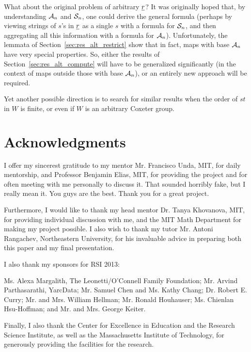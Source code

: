 What about the original problem of arbitrary $\ul r$?  It was originally hoped that, by understanding $\AA_n$ and $\SS_n$, one could derive the general formula (perhaps by viewing strings of $s$'s in $\ul r$ as a single $s$ with a formula for $\SS_n$, and then aggregating all this information with a formula for $\AA_n$).  Unfortunately, the lemmata of Section~\ref{sec:res_alt_restrict} show that in fact, maps with base $\AA_n$ have very special properties.  So, either the results of Section~\ref{sec:res_alt_compute} will have to be generalized significantly (in the context of maps outside those with base $\AA_n$), or an entirely new approach will be required.

Yet another possible direction is to search for similar results when the order of $st$ in $W$ is finite, or even if $W$ is an arbitrary Coxeter group.

\section{Acknowledgments} 
I offer my sincerest gratitude to my mentor Mr. Francisco Unda, MIT, for daily mentorship, and Professor Benjamin Elias, MIT, for providing the project and for often meeting with me personally to discuss it.  That sounded horribly fake, but I really mean it.  You guys are the best.  Thank you for a great project.

Furthermore, I would like to thank my head mentor Dr. Tanya Khovanova, MIT, for providing individual discussion with me, and the MIT Math Department for making my project possible.
I also wish to thank my tutor Mr. Antoni Rangachev, Northeastern University, for his invaluable advice in preparing both this paper and my final presentation.

I also thank my sponsors for RSI 2013:
\begin{inparaenum}[]
	\ii Ms. Alexa Margalith, The Leonetti\slash O'Connell Family Foundation;
	\ii Mr. Arvind Parthasarathi, YarcData;
	\ii Mr. Samuel Chen and Ms. Kathy Chang;
	\ii Dr. Robert E. Curry;
	\ii Mr. and Mrs. William Hellman;
	\ii Mr. Ronald Houhauser;
	\ii Ms. Chienlan Hsu-Hoffman; and
	\ii Mr. and Mrs. George Keiter.
\end{inparaenum}

Finally, I also thank the Center for Excellence in Education and the Research Science Institute, as well as the Massachusetts Institute of Technology, for generously providing the facilities for the research.
